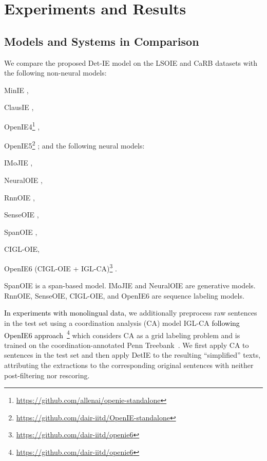 \documentclass[letterpaper]{article} \usepackage{aaai22}  \usepackage{times}  \usepackage{helvet}  \usepackage{courier}  \usepackage[hyphens]{url}  \usepackage{graphicx} \usepackage{placeins}
\newcommand{\added}[1]{\textcolor{black}{#1}}
\begin{document}
\section{Experiments and Results}\label{sec:experiments}

\subsection{Models and Systems in Comparison}\label{ssec:compared_systems}
We compare the proposed Det-IE model on the LSOIE and CaRB datasets with the following non-neural models: 
\begin{inparaenum}[(1)]
\item MinIE \cite{gashteovski2017minie}, \item  ClausIE \cite{del2013clausie}, \item  OpenIE4\footnote{\url{https://github.com/allenai/openie-standalone}} \cite{christensen2011analysis},
\item OpenIE5\footnote{\url{https://github.com/dair-iitd/OpenIE-standalone}} \cite{saha2017bootstrapping,saha2018open}; and the following neural models:
\item IMoJIE \cite{kolluru2020imojie},
\item NeuralOIE \cite{cui-etal-2018-neural},
\item RnnOIE \cite{stanovsky-etal-2018-supervised},
\item SenseOIE \cite{roy-etal-2019-supervising},
\item SpanOIE \cite{zhan2020span},
\item CIGL-OIE, 
\item OpenIE6 (CIGL-OIE + IGL-CA)\footnote{\url{https://github.com/dair-iitd/openie6}} \cite{kolluru2020openie6}.
\end{inparaenum}
SpanOIE is a span-based model. IMoJIE and NeuralOIE are generative models. RnnOIE, SenseOIE, CIGL-OIE, and OpenIE6 are sequence labeling models. 

\added{In experiments with monolingual data}, 
we additionally preprocess raw sentences in the test set using a coordination analysis (CA) model IGL-CA \added{following OpenIE6 approach}~\cite{kolluru2020openie6}\footnote{\url{https://github.com/dair-iitd/openie6}} which considers CA as a grid labeling problem and is trained on the coordination-annotated Penn Treebank~\cite{ficler2016coordination}. We first apply CA to sentences in the test set and then apply DetIE to the resulting ``simplified'' texts, attributing the extractions to the corresponding original sentences with neither post-filtering nor rescoring.
\end{document}
